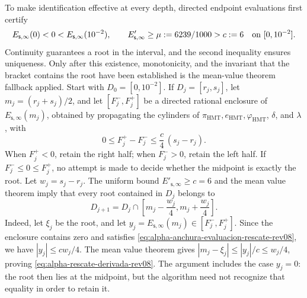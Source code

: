 To make identification effective at every depth, directed endpoint
evaluations first certify
\[
 E_{\mathsf s,\infty}(0)<0<
 E_{\mathsf s,\infty}(10^{-2}),
 \qquad
 E'_{\mathsf s,\infty}\geq\mu:=6239/1000>c:=6
 \quad\hbox{on }[0,10^{-2}].
\]
Continuity guarantees a root in the interval, and the second inequality
ensures uniqueness. Only after this existence, monotonicity, and the invariant
that the bracket contains the root have been established is the mean-value
theorem fallback applied. Start with \(D_0=[0,10^{-2}]\). If
\(D_j=[r_j,s_j]\), let \(m_j=(r_j+s_j)/2\), and let
\([F_j^-,F_j^+]\) be a directed rational enclosure of
\(E_{\mathsf s,\infty}(m_j)\), obtained by propagating the cylinders of
\(\pi_{\mathrm{HMT}},e_{\mathrm{HMT}},\varphi_{\mathrm{HMT}}\),
\(\delta\), and \(\lambda\), with
\begin{equation}
 0\leq F_j^+-F_j^-\leq \frac{c}{4}\,(s_j-r_j).
 \label{eq:alpha-anchura-evaluacion-rescate-rev08}
\end{equation}
When \(F_j^+<0\), retain the right half;
when \(F_j^->0\), retain the left half. If
\(F_j^-\leq0\leq F_j^+\), no attempt is made to decide whether the midpoint
is exactly the root. Let \(w_j=s_j-r_j\). The uniform bound
\(E'_{\mathsf s,\infty}\geq c=6\) and the mean value theorem imply that
every root contained in \(D_j\) belongs to
\begin{equation}
 D_{j+1}=D_j\cap
 \left[m_j-\frac{w_j}{4},
             m_j+\frac{w_j}{4}\right].
 \label{eq:alpha-rescate-derivada-rev08}
\end{equation}
Indeed, let \(\xi_j\) be the root, and let
\(y_j=E_{\mathsf s,\infty}(m_j)\in[F_j^-,F_j^+]\). Since the enclosure
contains zero and satisfies \eqref{eq:alpha-anchura-evaluacion-rescate-rev08},
we have \(|y_j|\leq cw_j/4\). The mean value theorem gives
\(|m_j-\xi_j|\leq |y_j|/c\leq w_j/4\), proving
\eqref{eq:alpha-rescate-derivada-rev08}. The argument includes the case
\(y_j=0\): the root then lies at the midpoint, but the algorithm need not
recognize that equality in order to retain it.

